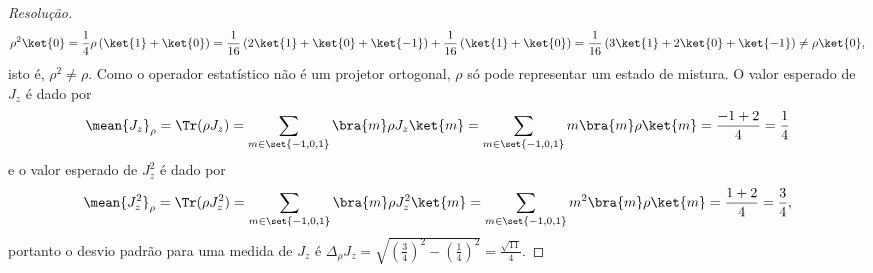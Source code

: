 \begin{proof}[Resolução]
   \begin{equation*}
      \rho^2\ket{0} = \frac14 \rho \left(\ket{1} + \ket{0}\right) = \frac{1}{16}\left(2 \ket{1} + \ket{0} + \ket{-1}\right) + \frac{1}{16}\left(\ket{1} + \ket{0}\right) = \frac{1}{16}\left(3\ket{1} + 2\ket{0} + \ket{-1}\right) \neq \rho \ket{0},
   \end{equation*}
   isto é, \(\rho^2 \neq \rho\). Como o operador estatístico não é um projetor ortogonal, \(\rho\) só pode representar um estado de mistura. O valor esperado de \(J_z\) é dado por
   \begin{equation*}
      \mean{J_z}_\rho = \Tr(\rho J_z) = \sum_{m \in \set{-1, 0, 1}} \bra{m}\rho J_z \ket{m} = \sum_{m \in \set{-1,0,1}} m \bra{m}\rho\ket{m} = \frac{-1 + 2}{4} = \frac{1}{4}
   \end{equation*}
   e o valor esperado de \(J_z^2\) é dado por
   \begin{equation*}
      \mean{J_z^2}_\rho = \Tr(\rho J_z^2) = \sum_{m \in \set{-1, 0, 1}} \bra{m}\rho J_z^2 \ket{m} = \sum_{m \in \set{-1,0,1}} m^2 \bra{m}\rho\ket{m} = \frac{1 + 2}{4} = \frac{3}{4},
   \end{equation*}
   portanto o desvio padrão para uma medida de \(J_z\) é \(\Delta_\rho{J_z} = \sqrt{\left(\frac{3}{4}\right)^2 - \left(\frac{1}{4}\right)^2} = \frac{\sqrt{11}}{4}.\)
\end{proof}
